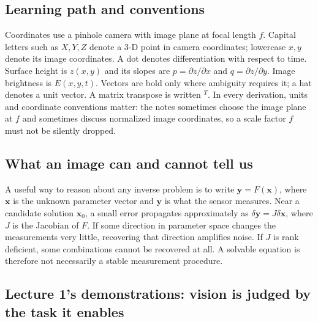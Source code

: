 \subsection{Learning path and conventions}\label{03-visual-computing-i-ch001-learning-path-and-conventions}

Coordinates use a pinhole camera with image plane at focal length \(f\). Capital letters such as \(X,Y,Z\) denote a 3-D point in camera coordinates; lowercase \(x,y\) denote its image coordinates. A dot denotes differentiation with respect to time. Surface height is \(z(x,y)\) and its slopes are \(p=\partial z/\partial x\) and \(q=\partial z/\partial y\). Image brightness is \(E(x,y,t)\). Vectors are bold only where ambiguity requires it; a hat denotes a unit vector. A matrix transpose is written \(^T\). In every derivation, units and coordinate conventions matter: the notes sometimes choose the image plane at \(f\) and sometimes discuss normalized image coordinates, so a scale factor \(f\) must not be silently dropped.

\subsection{What an image can and cannot tell us}\label{03-visual-computing-i-ch001-what-an-image-can-and-cannot-tell-us}

A useful way to reason about any inverse problem is to write \(\mathbf{y}=F(\mathbf{x})\), where \(\mathbf{x}\) is the unknown parameter vector and \(\mathbf{y}\) is what the sensor measures. Near a candidate solution \(\mathbf{x}_0\), a small error propagates approximately as \(\delta\mathbf{y}=J\delta\mathbf{x}\), where \(J\) is the Jacobian of \(F\). If some direction in parameter space changes the measurements very little, recovering that direction amplifies noise. If \(J\) is rank deficient, some combinations cannot be recovered at all. A solvable equation is therefore not necessarily a stable measurement procedure.

\subsection{Lecture 1's demonstrations: vision is judged by the task it enables}\label{03-visual-computing-i-ch001-lecture-1s-demonstrations-vision-is-judged-by-the-task-it-enables}

